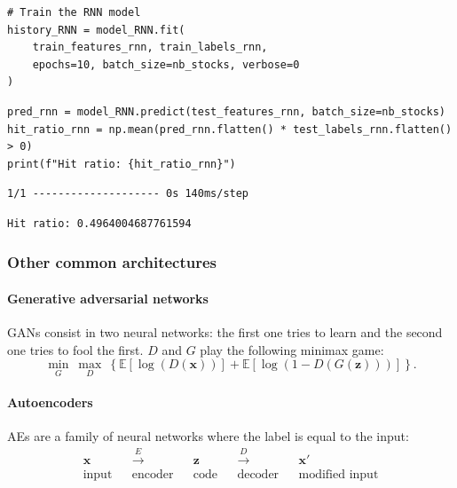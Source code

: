 \begin{verbatim}
# Train the RNN model
history_RNN = model_RNN.fit(
    train_features_rnn, train_labels_rnn,
    epochs=10, batch_size=nb_stocks, verbose=0
)
\end{verbatim}

\begin{verbatim}
pred_rnn = model_RNN.predict(test_features_rnn, batch_size=nb_stocks)
hit_ratio_rnn = np.mean(pred_rnn.flatten() * test_labels_rnn.flatten() > 0)
print(f"Hit ratio: {hit_ratio_rnn}")
\end{verbatim}

\begin{verbatim}
1/1 -------------------- 0s 140ms/step
\end{verbatim}

\begin{verbatim}
Hit ratio: 0.4964004687761594
\end{verbatim}

\subsubsection{Other common architectures}

\paragraph{Generative adversarial networks}\label{generative-aversarial-networks}

GANs consist in two neural networks: the first one tries to learn and the second one tries to fool the first. $D$ and $G$ play the following minimax game:
\begin{equation}
\underset{G}{\min} \ \underset{D}{\max} \ \left\{ \mathbb{E}[\log(D(\textbf{x}))]+\mathbb{E}[\log(1-D(G(\textbf{z})))] \right\}.
\end{equation}

\paragraph{Autoencoders}\label{autoencoders}

AEs are a family of neural networks where the label is equal to the input:
\begin{equation}
\begin{array}{ccccccccc}
\textbf{x} & &\overset{E}{\longrightarrow} && \textbf{z} && \overset{D}{\longrightarrow} && \textbf{x}' \\
\text{input} && \text{encoder} && \text{code} && \text{decoder} && \text{modified input}
\end{array}
\end{equation}


